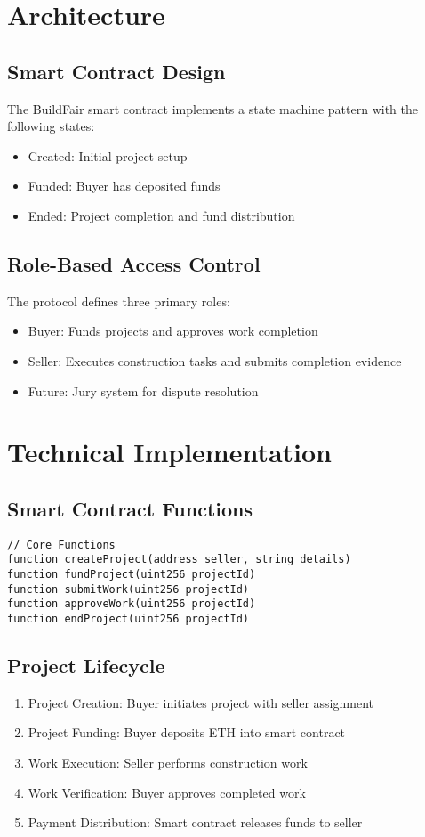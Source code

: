 \documentclass[12pt]{article}
\begin{document}
\section{Architecture}
\subsection{Smart Contract Design}
The BuildFair smart contract implements a state machine pattern with the following states:
\begin{itemize}
    \item Created: Initial project setup
    \item Funded: Buyer has deposited funds
    \item Ended: Project completion and fund distribution
\end{itemize}

\subsection{Role-Based Access Control}
The protocol defines three primary roles:
\begin{itemize}
    \item Buyer: Funds projects and approves work completion
    \item Seller: Executes construction tasks and submits completion evidence
    \item Future: Jury system for dispute resolution
\end{itemize}

\section{Technical Implementation}
\subsection{Smart Contract Functions}
\begin{lstlisting}[language=Solidity]
// Core Functions
function createProject(address seller, string details)
function fundProject(uint256 projectId)
function submitWork(uint256 projectId)
function approveWork(uint256 projectId)
function endProject(uint256 projectId)
\end{lstlisting}

\subsection{Project Lifecycle}
\begin{enumerate}
    \item Project Creation: Buyer initiates project with seller assignment
    \item Project Funding: Buyer deposits ETH into smart contract
    \item Work Execution: Seller performs construction work
    \item Work Verification: Buyer approves completed work
    \item Payment Distribution: Smart contract releases funds to seller
\end{enumerate}
\end{document}

